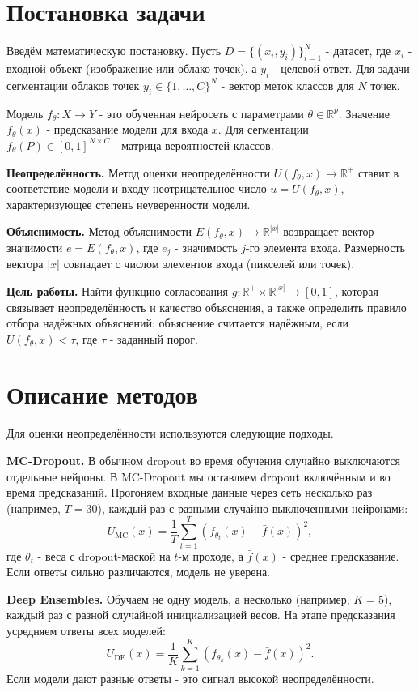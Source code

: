 \documentclass{misisarticle}
\begin{document}
\section{Постановка задачи}
Введём математическую постановку. Пусть $D = \{(x_i, y_i)\}_{i=1}^{N}$ - датасет, где $x_i$ - входной объект (изображение или облако точек), а $y_i$ - целевой ответ. Для задачи сегментации облаков точек $y_i \in \{1, \dots, C\}^N$ - вектор меток классов для $N$ точек.

Модель $f_\theta: X \to Y$ - это обученная нейросеть с параметрами $\theta \in \mathbb{R}^p$. Значение $f_\theta(x)$ - предсказание модели для входа $x$. Для сегментации $f_\theta(P) \in [0, 1]^{N \times C}$ - матрица вероятностей классов.

\textbf{Неопределённость.} Метод оценки неопределённости $U(f_\theta, x) \to \mathbb{R}^+$ ставит в соответствие модели и входу неотрицательное число $u = U(f_\theta, x)$, характеризующее степень неуверенности модели.

\textbf{Объяснимость.} Метод объяснимости $E(f_\theta, x) \to \mathbb{R}^{|x|}$ возвращает вектор значимости $e = E(f_\theta, x)$, где $e_j$ - значимость $j$-го элемента входа. Размерность вектора $|x|$ совпадает с числом элементов входа (пикселей или точек).

\textbf{Цель работы.} Найти функцию согласования $g: \mathbb{R}^+ \times \mathbb{R}^{|x|} \to [0, 1]$, которая связывает неопределённость и качество объяснения, а также определить правило отбора надёжных объяснений: объяснение считается надёжным, если $U(f_\theta, x) < \tau$, где $\tau$ - заданный порог.

\section{Описание методов}
Для оценки неопределённости используются следующие подходы.

\textbf{MC-Dropout.} В обычном dropout во время обучения случайно выключаются отдельные нейроны. В MC-Dropout мы оставляем dropout включённым и во время предсказаний. Прогоняем входные данные через сеть несколько раз (например, $T = 30$), каждый раз с разными случайно выключенными нейронами:
$$U_{\text{MC}}(x) = \frac{1}{T} \sum_{t=1}^{T} \left( f_{\theta_t}(x) - \bar{f}(x) \right)^2,$$
где $\theta_t$ - веса с dropout-маской на $t$-м проходе, а $\bar{f}(x)$ - среднее предсказание. Если ответы сильно различаются, модель не уверена.

\textbf{Deep Ensembles.} Обучаем не одну модель, а несколько (например, $K = 5$), каждый раз с разной случайной инициализацией весов. На этапе предсказания усредняем ответы всех моделей:
$$U_{\text{DE}}(x) = \frac{1}{K} \sum_{k=1}^{K} \left( f_{\theta_k}(x) - \bar{f}(x) \right)^2.$$
Если модели дают разные ответы - это сигнал высокой неопределённости.
\end{document}
